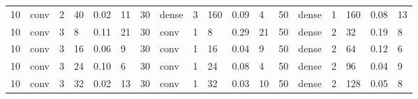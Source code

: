 \begin{table}
{\begin{tabular}{@{}llllll|llllll|llllll@{}}
10                              & conv                           & 2                              & 40                             & 0.02                             & 11                                & 30                              & dense                          & 3                              & 160                            & 0.09                           & 4                                 & 50                              & dense                          & 1                              & 160                            & 0.08                           & 13                               \\
10                              & conv                           & 3                              & 8                              & 0.11                             & 21                                & 30                              & conv                           & 1                              & 8                              & 0.29                           & 21                                & 50                              & dense                          & 2                              & 32                             & 0.19                           & 8                                \\
10                              & conv                           & 3                              & 16                             & 0.06                             & 9                                 & 30                              & conv                           & 1                              & 16                             & 0.04                           & 9                                 & 50                              & dense                          & 2                              & 64                             & 0.12                           & 6                                \\
10                              & conv                           & 3                              & 24                             & 0.10                             & 6                                 & 30                              & conv                           & 1                              & 24                             & 0.08                           & 4                                 & 50                              & dense                          & 2                              & 96                             & 0.04                           & 9                                \\
10                              & conv                           & 3                              & 32                             & 0.02                             & 13                                & 30                              & conv                           & 1                              & 32                             & 0.03                           & 10                                & 50                              & dense                          & 2                              & 128                            & 0.05                           & 8                                \\

\end{tabular}}
\end{table}
